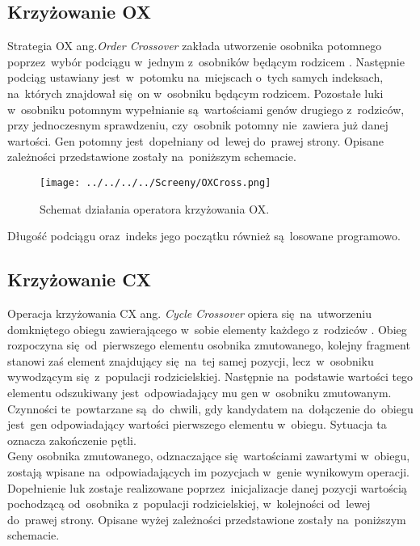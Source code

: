 
\subsection{Krzyżowanie OX}\label{sec:kompilacja}

Strategia OX ang.\textit{Order Crossover} zakłada utworzenie osobnika potomnego poprzez~wybór podciągu w~jednym z~osobników będącym rodzicem \cite{cross}. Następnie podciąg ustawiany jest~w~potomku na~miejscach o~tych samych indeksach, na~których znajdował się~on w~osobniku będącym rodzicem. Pozostałe luki w~osobniku potomnym wypełnianie są~wartościami genów drugiego z~rodziców, przy jednoczesnym sprawdzeniu, czy~osobnik potomny nie~zawiera już danej wartości. Gen potomny jest~dopełniany od~lewej do~prawej strony. Opisane zależności przedstawione zostały na~poniższym schemacie.


\begin{figure}[h!]
\centering
		\texttt{[image: ../../../../Screeny/OXCross.png]}
		\caption{Schemat działania operatora krzyżowania OX.}
		\label{schematOX}			
\end{figure}

Długość podciągu oraz~indeks jego początku również są~losowane programowo.


\subsection{Krzyżowanie CX}\label{crossCX_sub}

Operacja krzyżowania CX ang. \textit{Cycle Crossover} opiera się~na~utworzeniu domkniętego obiegu zawierającego w~sobie elementy każdego z~rodziców \cite{crossovers}. Obieg rozpoczyna się~od~pierwszego elementu osobnika zmutowanego, kolejny fragment stanowi zaś element znajdujący się~na~tej samej pozycji, lecz~w~osobniku wywodzącym się~z~populacji rodzicielskiej. Następnie na~podstawie wartości tego elementu odszukiwany jest~odpowiadający mu gen w~osobniku zmutowanym. Czynności te~powtarzane są~do~chwili, gdy kandydatem na~dołączenie do~obiegu jest~gen odpowiadający wartości pierwszego elementu w~obiegu. Sytuacja ta oznacza zakończenie pętli. \\
Geny osobnika zmutowanego, odznaczające się~wartościami zawartymi w~obiegu, zostają wpisane na~odpowiadających im pozycjach w~genie wynikowym operacji. Dopełnienie luk zostaje realizowane poprzez~inicjalizacje danej pozycji wartością pochodzącą od~osobnika z~populacji rodzicielskiej, w~kolejności od~lewej do~prawej strony. Opisane wyżej zależności przedstawione zostały na~poniższym schemacie.


